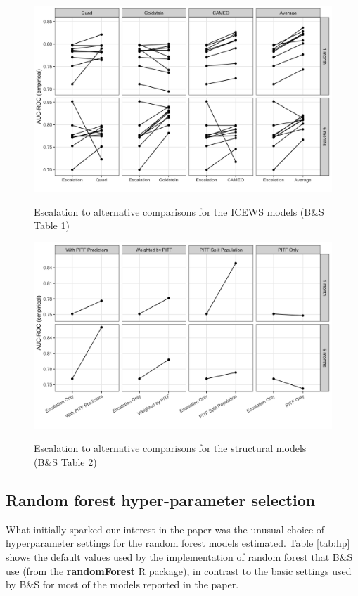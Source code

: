 \documentclass[
]{article}
\begin{document}
\begin{figure}
{\centering
\includegraphics[width=.9\linewidth]{figures/fig-A1-table1-pairs.png}
}
\caption{Escalation to alternative comparisons for the ICEWS models (B\&S Table 1)\label{fig:table1-plot}}
\end{figure}

\begin{figure}
{\centering
\includegraphics[width=.9\linewidth]{figures/fig-A2-table2-pairs.png}
}
\caption{Escalation to alternative comparisons for the structural models (B\&S Table 2)\label{fig:table2-plot}}
\end{figure}

\newpage

\hypertarget{random-forest-hyper-parameter-selection}{%
\subsection{Random forest hyper-parameter selection}\label{random-forest-hyper-parameter-selection}}

What initially sparked our interest in the paper was the unusual choice of hyperparameter settings for the random forest models estimated. Table \ref{tab:hp} shows the default values used by the implementation of random forest that B\&S use (from the \textbf{randomForest} R package), in contrast to the basic settings used by B\&S for most of the models reported in the paper.
\end{document}

